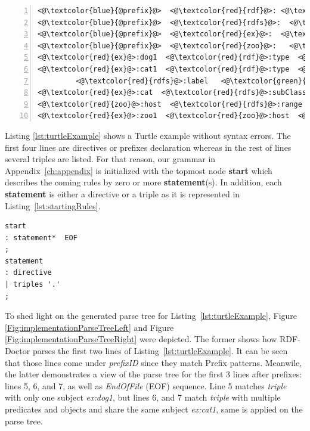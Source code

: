 \begin{lstlisting}[label=lst:turtleExample, numbers=left, caption={RDF example in Turtle serialization format}]
<@\textcolor{blue}{@prefix}@>  <@\textcolor{red}{rdf}@>: <@\textcolor{orange}{<http://www.w3.org/1999/02/22-rdf-syntax-ns\#>}@> .
<@\textcolor{blue}{@prefix}@>  <@\textcolor{red}{rdfs}@>:  <@\textcolor{orange}{<http://www.w3.org/2000/01/rdf-schema\#>}@> .
<@\textcolor{blue}{@prefix}@>  <@\textcolor{red}{ex}@>:  <@\textcolor{orange}{<http://example.org/>}@> .
<@\textcolor{blue}{@prefix}@>  <@\textcolor{red}{zoo}@>:   <@\textcolor{orange}{<http://example.org/zoo/> }@> .
<@\textcolor{red}{ex}@>:dog1  <@\textcolor{red}{rdf}@>:type  <@\textcolor{red}{ex}@>:animal .
<@\textcolor{red}{ex}@>:cat1  <@\textcolor{red}{rdf}@>:type  <@\textcolor{red}{ex}@>:cat ;
         <@\textcolor{red}{rdfs}@>:label   <@\textcolor{green}{``Lusi"@en}@> .
<@\textcolor{red}{ex}@>:cat  <@\textcolor{red}{rdfs}@>:subClassOf  <@\textcolor{red}{ex}@>:animal .
<@\textcolor{red}{zoo}@>:host  <@\textcolor{red}{rdfs}@>:range  <@\textcolor{red}{ex}@>:animal .
<@\textcolor{red}{ex}@>:zoo1  <@\textcolor{red}{zoo}@>:host  <@\textcolor{red}{ex}@>:cat2 .
\end{lstlisting}

Listing \ref{lst:turtleExample} shows a Turtle example without syntax errors. 
The first four lines are directives or prefixes declaration whereas in the rest of lines several triples are listed.  
For that reason, our grammar in Appendix~\ref{ch:appendix} is initialized with the topmost node \textbf{start} which describes the coming rules by zero or more  \textbf{statement}(s). 
In addition, each \textbf{statement} is either a directive or a triple as it is represented in Listing~\ref{lst:startingRules}.

\begin{lstlisting}[label=lst:startingRules,
caption={Starting rules in the grammar file}] 
start
: statement*  EOF
;
statement
: directive
| triples '.'
;
\end{lstlisting}

To shed light on the generated parse tree for Listing~\ref{lst:turtleExample}, Figure \ref{Fig:implementationParseTreeLeft}
and Figure \ref{Fig:implementationParseTreeRight}
were depicted. The former shows how RDF-Doctor parses the first two lines of  Listing~\ref{lst:turtleExample}. It can be seen that those lines come under \emph{prefixID} since they match Prefix patterns. Meanwile, the latter demonstrates a view of the parse tree for the first 3 lines after prefixes: lines 5, 6, and 7, as well as \emph{EndOfFile} (EOF) sequence. Line 5 matches \emph{triple} with only one subject \emph{ex:dog1}, but lines 6, and 7 match \emph{triple} with multiple predicates and objects and share the same subject \emph{ex:cat1}, same is applied on the parse tree.  





